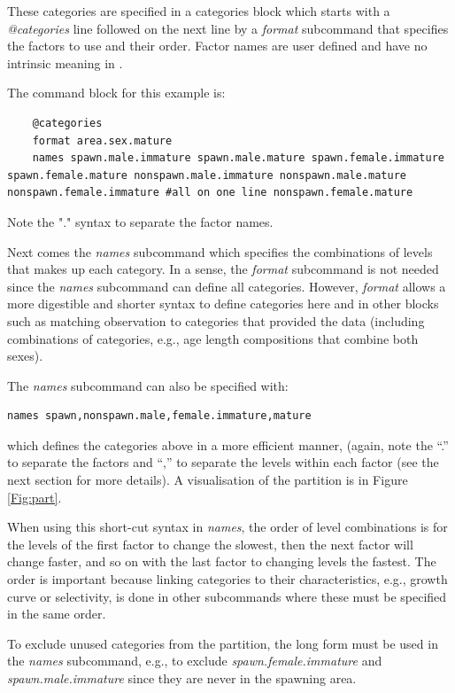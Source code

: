 These categories are specified in a categories block which starts with a \textit{@categories} line followed on the next line by a \textit{format} subcommand that specifies the factors to use and their order. Factor names are user defined and have no intrinsic meaning in \CNAME.

The command block for this example is:

{\small{\begin{lstlisting}
	@categories
	format area.sex.mature
	names spawn.male.immature spawn.male.mature spawn.female.immature spawn.female.mature nonspawn.male.immature nonspawn.male.mature nonspawn.female.immature #all on one line nonspawn.female.mature
\end{lstlisting}}}  %

Note the "." syntax to separate the factor names.

Next comes the \textit{names} subcommand which specifies the combinations of levels that makes up each category. In a sense, the \textit{format} subcommand is not needed since the \textit{names} subcommand can define all categories. However, \textit{format} allows a more  digestible and shorter syntax to define categories here and in other blocks such as matching observation to categories that provided the data (including combinations of categories, e.g., \ifAgeBased age \else length \fi compositions that combine both sexes).

The \textit{names} subcommand can also be specified with:

{\small{\begin{verbatim}names spawn,nonspawn.male,female.immature,mature
\end{verbatim}}}

which defines the categories above in a more efficient manner, (again, note the ``.'' to separate the factors and ``,'' to separate the levels within each factor (see the next section for more details). A visualisation of the partition is in Figure \ref{Fig:part}.

When using this short-cut syntax in \textit{names}, the order of level combinations is for the levels of the first factor to change the slowest, then the next factor will change faster, and so on with the last factor to changing levels the fastest. The order is important because linking categories to their characteristics, e.g., growth curve or selectivity, is done in other subcommands where these must be specified in the same order.

To exclude unused categories from the partition, the long form must be used in the \textit{names} subcommand, e.g., to exclude  \textit{spawn.female.immature} and \textit{spawn.male.immature} since they are never in the spawning area.

